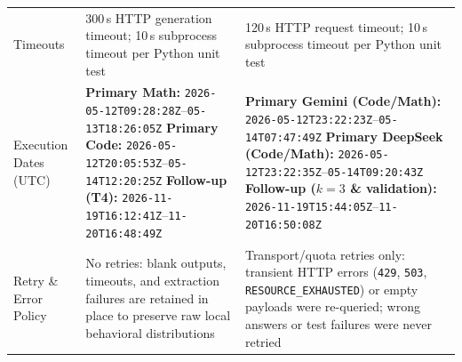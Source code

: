 \documentclass[a4paper,fleqn]{cas-sc}
\begin{document}
\begin{table}[!htbp]
\begin{tabular}{@{}p{}p{}p{}@{}}
Timeouts & 300\,s HTTP generation timeout; 10\,s subprocess timeout per Python unit test & 120\,s HTTP request timeout; 10\,s subprocess timeout per Python unit test \\
Execution Dates (UTC) & \textbf{Primary Math:} \texttt{2026-05-12T09:28:28Z}--\texttt{05-13T18:26:05Z}\newline
\textbf{Primary Code:} \texttt{2026-05-12T20:05:53Z}--\texttt{05-14T12:20:25Z}\newline
\textbf{Follow-up (T4):} \texttt{2026-11-19T16:12:41Z}--\texttt{11-20T16:48:49Z} & \textbf{Primary Gemini (Code/Math):} \texttt{2026-05-12T23:22:23Z}--\texttt{05-14T07:47:49Z}\newline
\textbf{Primary DeepSeek (Code/Math):} \texttt{2026-05-12T23:22:35Z}--\texttt{05-14T09:20:43Z}\newline
\textbf{Follow-up ($k=3$ \& validation):} \texttt{2026-11-19T15:44:05Z}--\texttt{11-20T16:50:08Z} \\
Retry \& Error Policy & No retries: blank outputs, timeouts, and extraction failures are retained in place to preserve raw local behavioral distributions & Transport/quota retries only: transient HTTP errors (\texttt{429}, \texttt{503}, \texttt{RESOURCE\_EXHAUSTED}) or empty payloads were re-queried; wrong answers or test failures were never retried \\
\bottomrule
\end{tabular}
\end{table}
\end{document}
